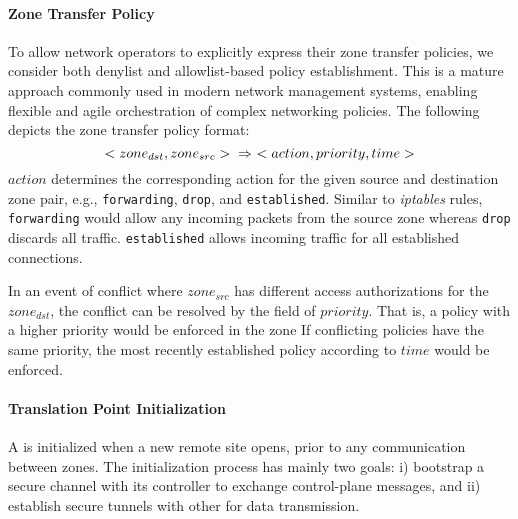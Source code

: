 \paragraph{Zone Transfer Policy}
To allow network operators to explicitly express their zone transfer policies, we 
consider both denylist and allowlist-based policy establishment. 
This is a
mature approach commonly used in modern network management systems, enabling flexible
and agile orchestration of complex networking policies. The following depicts the
zone transfer policy format:
\noindent 
\begin{equation}
<zone_{dst}, zone_{src}> \\ 
\Rightarrow~<action, priority, time>
\label{eq:policy}
\end{equation}
\noindent 
$action$ determines the corresponding action for the given source and destination
zone pair, e.g., \texttt{forwarding}, \texttt{drop}, and \texttt{established}. Similar
to \textit{iptables} rules, \texttt{forwarding} would allow any incoming packets from
the source zone whereas \texttt{drop} discards all traffic. \texttt{established} allows
incoming traffic for all established connections. 

In an event of conflict where $zone_{src}$ has different
access authorizations for the $zone_{dst}$, the conflict can be resolved by the field 
of $priority$. That is, a policy with a higher priority would be enforced in the zone 
If conflicting policies have the same priority, the most recently established policy 
according to $time$ would be enforced.


\paragraph{Translation Point Initialization} %
A \tp is initialized when a new remote site opens, prior to any communication between
zones. The initialization process has mainly two goals: i) bootstrap a secure channel 
with its controller to exchange control-plane messages, and ii) establish secure tunnels 
with other \tps for data transmission.

